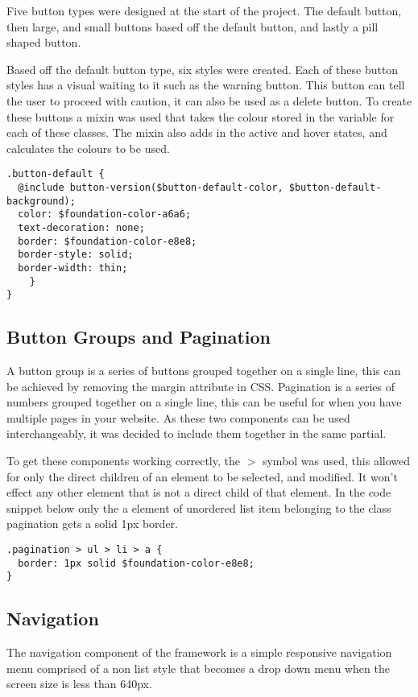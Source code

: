 Five button types were designed at the start of the project. The default button, then large, and small buttons based off the default button, and lastly a pill shaped button. 

Based off the default button type, six styles were created. Each of these button styles has a visual waiting to it such as the warning button. This button can tell the user to proceed with caution, it can also be used as a delete button. To create these buttons a mixin was used that takes the colour stored in the variable for each of these classes. The mixin also adds in the active and hover states, and calculates the colours to be used. 

\begin{lstlisting}[language=CSS3]
.button-default {
  @include button-version($button-default-color, $button-default-background);
  color: $foundation-color-a6a6;
  text-decoration: none;
  border: $foundation-color-e8e8;
  border-style: solid;
  border-width: thin;
	}
}
\end{lstlisting}

\subsection{Button Groups and Pagination}
A button group is a series of buttons grouped together on a single line, this can be achieved by removing the margin attribute in CSS. Pagination is a series of numbers grouped together on a single line, this can be useful for when you have multiple pages in your website. As these two components can be used interchangeably, it was decided to include them together in the same partial.

To get these components working correctly, the $>$ symbol was used, this allowed for only the direct children of an element to be selected, and modified. It won't effect any other element that is not a direct child of that element. In the code snippet below only the a element of unordered list item belonging to the class pagination gets a solid 1px border.   

\begin{lstlisting}[language=CSS3]
.pagination > ul > li > a {
  border: 1px solid $foundation-color-e8e8;
}
\end{lstlisting}

\subsection{Navigation}
The navigation component of the framework is a simple responsive navigation menu  comprised of a non list style that becomes a drop down menu when the screen size is less than 640px.

